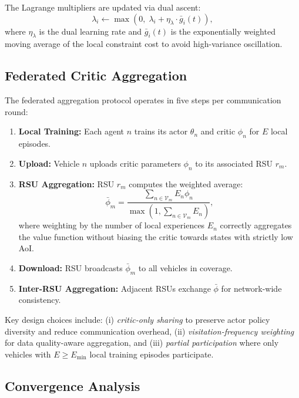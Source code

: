 \documentclass[journal]{IEEEtran}
\begin{document}
The Lagrange multipliers are updated via dual ascent:
\begin{equation} \label{eq:dual_update}
\lambda_i \leftarrow \max\left(0,\; \lambda_i + \eta_\lambda \cdot \bar{g}_i(t)\right),
\end{equation}
where $\eta_\lambda$ is the dual learning rate and $\bar{g}_i(t)$ is the exponentially weighted moving average of the local constraint cost to avoid high-variance oscillation.

\subsection{Federated Critic Aggregation} \label{subsec:3}

The federated aggregation protocol operates in five steps per communication round:

\begin{enumerate}
\item \textbf{Local Training:} Each agent $n$ trains its actor $\theta_n$ and critic $\phi_n$ for $E$ local episodes.
\item \textbf{Upload:} Vehicle $n$ uploads critic parameters $\phi_n$ to its associated RSU $r_m$.
\item \textbf{RSU Aggregation:} RSU $r_m$ computes the weighted average:
\begin{equation} \label{eq:fed_agg}
\bar{\phi}_m = \frac{\sum_{n \in \mathcal{V}_m} E_n \phi_n}{\max\left(1, \sum_{n \in \mathcal{V}_m} E_n\right)},
\end{equation}
where weighting by the number of local experiences $E_n$ correctly aggregates the value function without biasing the critic towards states with strictly low AoI.
\item \textbf{Download:} RSU broadcasts $\bar{\phi}_m$ to all vehicles in coverage.
\item \textbf{Inter-RSU Aggregation:} Adjacent RSUs exchange $\bar{\phi}$ for network-wide consistency.
\end{enumerate}

Key design choices include: (i) \emph{critic-only sharing} to preserve actor policy diversity and reduce communication overhead, (ii) \emph{visitation-frequency weighting} for data quality-aware aggregation, and (iii) \emph{partial participation} where only vehicles with $E \geq E_{\min}$ local training episodes participate.

\subsection{Convergence Analysis} \label{subsec:4}
\end{document}
